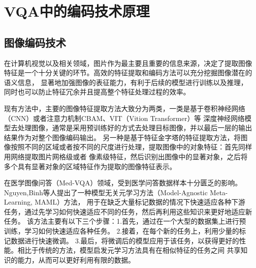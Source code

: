 \section{VQA中的编码技术原理}
\subsection{图像编码技术}
在计算机视觉以及相关领域，图片作为最主要且重要的信息来源，决定了提取图像特征是一个十分关键的环节。高效的特征提取和编码方法可以充分挖掘图像潜在的语义信息，
显著地加强图像的表征能力，有利于后续的模型进行训练以及推理，同时也可以防止特征冗余并且提高整个特征处理过程的效率。
 
现有方法中，主要的图像特征提取方法大致分为两类，一类是基于卷积神经网络（CNN）或者注意力机制CBAM、VIT（Vition Transformer）等
深度神经网络模型去处理图像，通常是采用预训练好的方式去处理目标图像，并以最后一层的输出结果作为对整个图像编码输出。
另一种是基于特征金字塔的特征提取方法，将图像按照不同的区域或者按不同的尺度进行处理，提取图像中的对象特征：首先同样用网络提取图片网格级或者
像素级特征，然后识别出图像中的显著对象，之后将多个具有显著对象的区域特征作为提取的图像特征表示。

在医学图像问答（Med-VQA）领域，受到医学问答数据样本十分匮乏的影响。Nguyen,Binh等人提出了一种模型无关元学习方法（Model-Agnostic Meta-Learning, MAML）\cite{nguyen2019overcoming}方法，
用于在缺乏大量标记数据的情况下快速适应各种下游任务，通过先学习如何快速适应不同的任务，然后再利用这些知识来更好地适应新任务。
该方法主要有以下三个步骤：1.首先，通过在一个大型的数据集上进行预训练，学习如何快速适应各种任务。
2.接着，在每个新的任务上，利用少量的标记数据进行快速微调。
3.最后，将微调后的模型应用于该任务，以获得更好的性能。相比于传统的方法，模型启发元学习方法具有在相似特征的任务之间
共享知识的能力，从而可以更好利用有限的数据。

